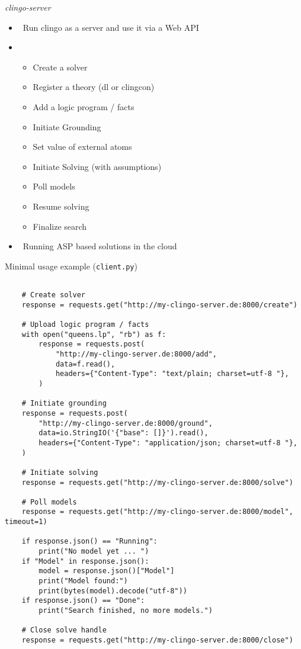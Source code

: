 \begin{frame}{\textit{clingo-server}}
  \begin{itemize}
    \item {} \ Run clingo as a server and use it via a Web API 
    \item {} \
      \begin{itemize}
        \item Create a solver
        \item Register a theory (dl or clingcon)
        \item Add a logic program / facts
        \item Initiate Grounding
        \item Set value of external atoms
        \item Initiate Solving (with assumptions)
        \item Poll models
        \item Resume solving
        \item Finalize search
      \end{itemize}
    \item {} \ Running ASP based solutions in the cloud
  \end{itemize}
\end{frame}

\begin{frame}{Minimal usage example (\texttt{client.py})}
  \begin{lstlisting}

    # Create solver 
    response = requests.get("http://my-clingo-server.de:8000/create")

    # Upload logic program / facts
    with open("queens.lp", "rb") as f:
        response = requests.post(
            "http://my-clingo-server.de:8000/add",
            data=f.read(),
            headers={"Content-Type": "text/plain; charset=utf-8 "},
        )

    # Initiate grounding
    response = requests.post(
        "http://my-clingo-server.de:8000/ground",
        data=io.StringIO('{"base": []}').read(),
        headers={"Content-Type": "application/json; charset=utf-8 "},
    )

    # Initiate solving
    response = requests.get("http://my-clingo-server.de:8000/solve")

    # Poll models
    response = requests.get("http://my-clingo-server.de:8000/model", timeout=1)

    if response.json() == "Running":
        print("No model yet ... ")
    if "Model" in response.json():
        model = response.json()["Model"]
        print("Model found:")
        print(bytes(model).decode("utf-8"))
    if response.json() == "Done":
        print("Search finished, no more models.")

    # Close solve handle
    response = requests.get("http://my-clingo-server.de:8000/close")

  \end{lstlisting}
\end{frame}

%

